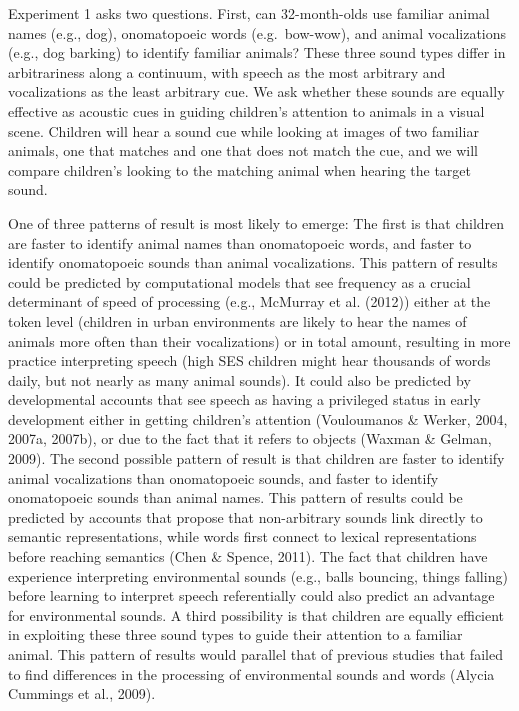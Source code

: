 \documentclass[english,floatsintext,man]{apa6}
\theoremstyle{definition}
\theoremstyle{definition}
\theoremstyle{definition}
\theoremstyle{remark}
\begin{document}
Experiment 1 asks two questions. First, can 32-month-olds use familiar
animal names (e.g., dog), onomatopoeic words (e.g.~bow-wow), and animal
vocalizations (e.g., dog barking) to identify familiar animals? These
three sound types differ in arbitrariness along a continuum, with speech
as the most arbitrary and vocalizations as the least arbitrary cue. We
ask whether these sounds are equally effective as acoustic cues in
guiding children's attention to animals in a visual scene. Children will
hear a sound cue while looking at images of two familiar animals, one
that matches and one that does not match the cue, and we will compare
children's looking to the matching animal when hearing the target sound.

One of three patterns of result is most likely to emerge: The first is
that children are faster to identify animal names than onomatopoeic
words, and faster to identify onomatopoeic sounds than animal
vocalizations. This pattern of results could be predicted by
computational models that see frequency as a crucial determinant of
speed of processing (e.g., McMurray et al. (2012)) either at the token
level (children in urban environments are likely to hear the names of
animals more often than their vocalizations) or in total amount,
resulting in more practice interpreting speech (high SES children might
hear thousands of words daily, but not nearly as many animal sounds). It
could also be predicted by developmental accounts that see speech as
having a privileged status in early development either in getting
children's attention (Vouloumanos \& Werker, 2004, 2007a, 2007b), or due
to the fact that it refers to objects (Waxman \& Gelman, 2009). The
second possible pattern of result is that children are faster to
identify animal vocalizations than onomatopoeic sounds, and faster to
identify onomatopoeic sounds than animal names. This pattern of results
could be predicted by accounts that propose that non-arbitrary sounds
link directly to semantic representations, while words first connect to
lexical representations before reaching semantics (Chen \& Spence,
2011). The fact that children have experience interpreting environmental
sounds (e.g., balls bouncing, things falling) before learning to
interpret speech referentially could also predict an advantage for
environmental sounds. A third possibility is that children are equally
efficient in exploiting these three sound types to guide their attention
to a familiar animal. This pattern of results would parallel that of
previous studies that failed to find differences in the processing of
environmental sounds and words (Alycia Cummings et al., 2009).
\end{document}
